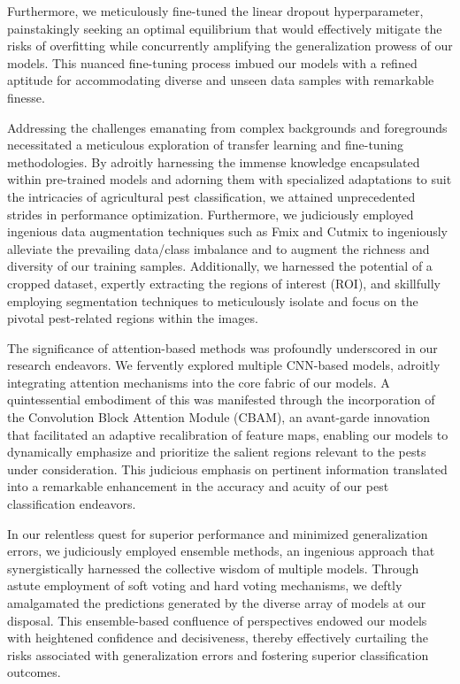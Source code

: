 Furthermore, we meticulously fine-tuned the linear dropout hyperparameter, painstakingly seeking an optimal equilibrium that would effectively mitigate the risks of overfitting while concurrently amplifying the generalization prowess of our models. This nuanced fine-tuning process imbued our models with a refined aptitude for accommodating diverse and unseen data samples with remarkable finesse.

Addressing the challenges emanating from complex backgrounds and foregrounds necessitated a meticulous exploration of transfer learning and fine-tuning methodologies. By adroitly harnessing the immense knowledge encapsulated within pre-trained models and adorning them with specialized adaptations to suit the intricacies of agricultural pest classification, we attained unprecedented strides in performance optimization. Furthermore, we judiciously employed ingenious data augmentation techniques such as Fmix and Cutmix to ingeniously alleviate the prevailing data/class imbalance and to augment the richness and diversity of our training samples. Additionally, we harnessed the potential of a cropped dataset, expertly extracting the regions of interest (ROI), and skillfully employing segmentation techniques to meticulously isolate and focus on the pivotal pest-related regions within the images.

The significance of attention-based methods was profoundly underscored in our research endeavors. We fervently explored multiple CNN-based models, adroitly integrating attention mechanisms into the core fabric of our models. A quintessential embodiment of this was manifested through the incorporation of the Convolution Block Attention Module (CBAM), an avant-garde innovation that facilitated an adaptive recalibration of feature maps, enabling our models to dynamically emphasize and prioritize the salient regions relevant to the pests under consideration. This judicious emphasis on pertinent information translated into a remarkable enhancement in the accuracy and acuity of our pest classification endeavors.

In our relentless quest for superior performance and minimized generalization errors, we judiciously employed ensemble methods, an ingenious approach that synergistically harnessed the collective wisdom of multiple models. Through astute employment of soft voting and hard voting mechanisms, we deftly amalgamated the predictions generated by the diverse array of models at our disposal. This ensemble-based confluence of perspectives endowed our models with heightened confidence and decisiveness, thereby effectively curtailing the risks associated with generalization errors and fostering superior classification outcomes.

